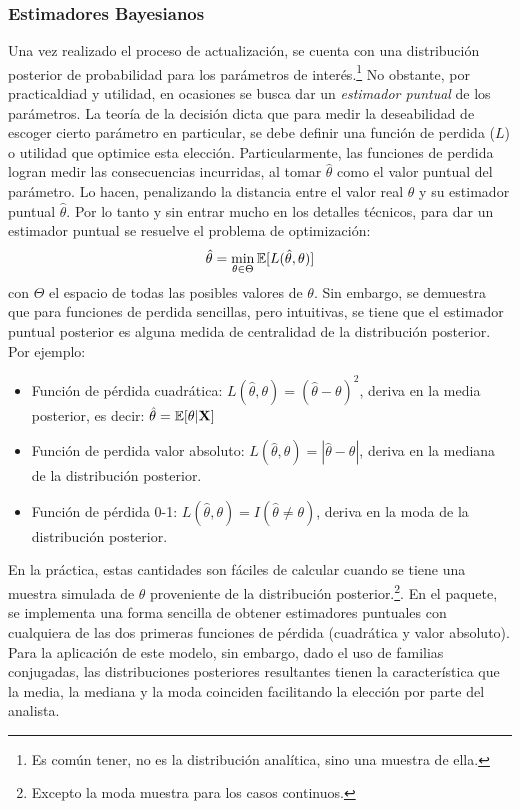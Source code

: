 \documentclass[../Main/Main.tex]{subfiles}
\begin{document}
\subsubsection{Estimadores Bayesianos}
Una vez realizado el proceso de actualización, se cuenta con una distribución posterior de probabilidad para los parámetros de interés.\footnote{Es común tener, no es la distribución analítica, sino una muestra de ella.} No obstante, por practicaldiad y utilidad, en ocasiones se busca dar un \textit{estimador puntual} de los parámetros. La teoría de la decisión dicta que para medir la deseabilidad de escoger cierto parámetro en particular, se debe definir una función de perdida ($L$) o utilidad que optimice esta elección. Particularmente, las funciones de perdida logran medir las consecuencias incurridas, al tomar $\hat{\theta}$ como el valor puntual del parámetro. Lo hacen, penalizando la distancia entre el valor real $\theta$ y su estimador puntual $\hat{\theta}$. Por lo tanto y sin entrar mucho en los detalles técnicos, para dar un estimador puntual se resuelve el problema de optimización: 
\begin{align}
\hat{\theta} = \min_{\theta \in{\Theta}}\mathbb{E}[L(\hat{\theta},\theta)]
\end{align}
con $\Theta$ el espacio de todas las posibles valores de $\theta$. Sin embargo, se demuestra que para funciones de perdida sencillas, pero intuitivas, se tiene que el estimador puntual posterior es alguna medida de centralidad de la distribución posterior. Por ejemplo:
\begin{itemize}[label={}]
	\item Función de pérdida cuadrática: $L(\hat{\theta},\theta) = (\hat{\theta}-\theta)^2$, deriva en la media posterior, es decir: $\hat{\theta} = \mathbb{E}[\theta|\mathbf{X}]$ 
	\item Función de perdida valor absoluto: $L(\hat{\theta},\theta) = |\hat{\theta}-\theta|$, deriva en la mediana de la distribución posterior.
	\item Función de pérdida 0-1:  $L(\hat{\theta},\theta) = I(\hat{\theta} \neq \theta)$, deriva en la moda de la distribución posterior. 
\end{itemize}
En la práctica, estas cantidades son fáciles de calcular cuando se tiene una muestra simulada de $\theta$ proveniente de la distribución posterior.\footnote{Excepto la moda muestra para los casos continuos.}. En el paquete, se implementa una forma sencilla de obtener estimadores puntuales con cualquiera de las dos primeras funciones de pérdida (cuadrática y valor absoluto). Para la aplicación de este modelo, sin embargo, dado el uso de familias conjugadas, las distribuciones posteriores resultantes tienen la característica que la media, la mediana y la moda coinciden facilitando la elección por parte del analista.
\end{document}
